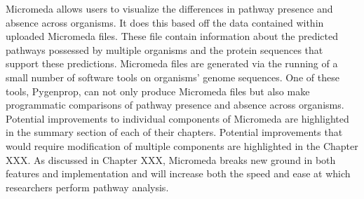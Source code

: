Micromeda allows users to visualize the differences in pathway presence and absence across organisms. It does this based off the data contained within uploaded Micromeda files. These file contain information about the predicted pathways possessed by multiple organisms and the protein sequences that support these predictions. Micromeda files are generated via the running of a small number of software tools on organisms' genome sequences. One of these tools, Pygenprop, can not only produce Micromeda files but also make programmatic comparisons of pathway presence and absence across organisms. Potential improvements to individual components of Micromeda are highlighted in the summary section of each of their chapters. Potential improvements that would require modification of multiple components are highlighted in the Chapter XXX. As discussed in Chapter XXX, Micromeda breaks new ground in both features and implementation and will increase both the speed and ease at which researchers perform pathway analysis.